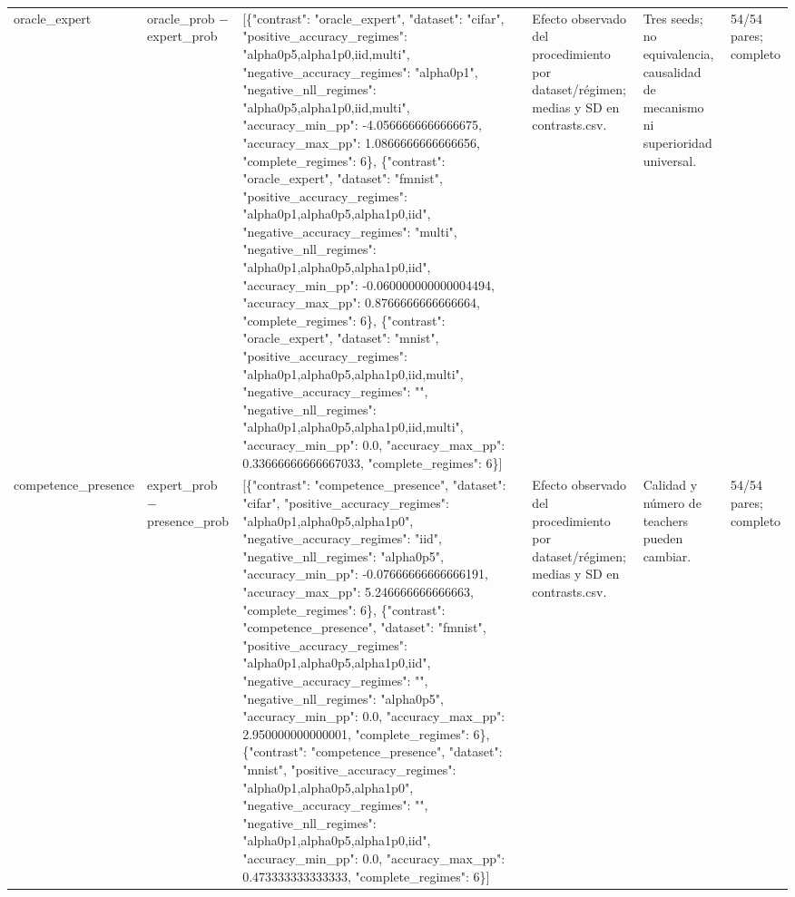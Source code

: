 \begin{tabular}{llllll}
oracle\_expert & oracle\_prob − expert\_prob & [\{"contrast": "oracle\_expert", "dataset": "cifar", "positive\_accuracy\_regimes": "alpha0p5,alpha1p0,iid,multi", "negative\_accuracy\_regimes": "alpha0p1", "negative\_nll\_regimes": "alpha0p5,alpha1p0,iid,multi", "accuracy\_min\_pp": -4.0566666666666675, "accuracy\_max\_pp": 1.0866666666666656, "complete\_regimes": 6\}, \{"contrast": "oracle\_expert", "dataset": "fmnist", "positive\_accuracy\_regimes": "alpha0p1,alpha0p5,alpha1p0,iid", "negative\_accuracy\_regimes": "multi", "negative\_nll\_regimes": "alpha0p1,alpha0p5,alpha1p0,iid", "accuracy\_min\_pp": -0.060000000000004494, "accuracy\_max\_pp": 0.8766666666666664, "complete\_regimes": 6\}, \{"contrast": "oracle\_expert", "dataset": "mnist", "positive\_accuracy\_regimes": "alpha0p1,alpha0p5,alpha1p0,iid,multi", "negative\_accuracy\_regimes": "", "negative\_nll\_regimes": "alpha0p1,alpha0p5,alpha1p0,iid,multi", "accuracy\_min\_pp": 0.0, "accuracy\_max\_pp": 0.33666666666667033, "complete\_regimes": 6\}] & Efecto observado del procedimiento por dataset/régimen; medias y SD en contrasts.csv. & Tres seeds; no equivalencia, causalidad de mecanismo ni superioridad universal. & 54/54 pares; completo \\
competence\_presence & expert\_prob − presence\_prob & [\{"contrast": "competence\_presence", "dataset": "cifar", "positive\_accuracy\_regimes": "alpha0p1,alpha0p5,alpha1p0", "negative\_accuracy\_regimes": "iid", "negative\_nll\_regimes": "alpha0p5", "accuracy\_min\_pp": -0.07666666666666191, "accuracy\_max\_pp": 5.246666666666663, "complete\_regimes": 6\}, \{"contrast": "competence\_presence", "dataset": "fmnist", "positive\_accuracy\_regimes": "alpha0p1,alpha0p5,alpha1p0,iid", "negative\_accuracy\_regimes": "", "negative\_nll\_regimes": "alpha0p5", "accuracy\_min\_pp": 0.0, "accuracy\_max\_pp": 2.950000000000001, "complete\_regimes": 6\}, \{"contrast": "competence\_presence", "dataset": "mnist", "positive\_accuracy\_regimes": "alpha0p1,alpha0p5,alpha1p0", "negative\_accuracy\_regimes": "", "negative\_nll\_regimes": "alpha0p1,alpha0p5,alpha1p0,iid", "accuracy\_min\_pp": 0.0, "accuracy\_max\_pp": 0.473333333333333, "complete\_regimes": 6\}] & Efecto observado del procedimiento por dataset/régimen; medias y SD en contrasts.csv. & Calidad y número de teachers pueden cambiar. & 54/54 pares; completo \\

\end{tabular}

